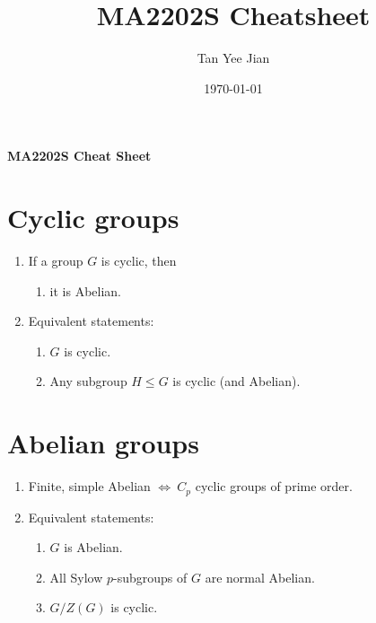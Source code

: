 \documentclass[10pt]{article}
\title{MA2202S Cheatsheet}
\author{Tan Yee Jian}
\date{\today}
\newcommand{\spss}{Sylow $p$-subgroups }
\begin{document}
\begin{center}
  \Large{\textbf{MA2202S Cheat Sheet}}
\end{center}
\begin{multicols*}{3}
  \section{Cyclic groups}
  \begin{enumerate}
    \item If a group $G$ is cyclic, then
    \begin{enumerate}
\item it is Abelian.
    \end{enumerate}
    \item Equivalent statements:
    \begin{enumerate}
      \item $G$ is cyclic.
      \item Any subgroup $H\leq G$ is cyclic (and Abelian).
    \end{enumerate}
  \end{enumerate}
  \section{Abelian groups}
\begin{enumerate}
    \item Finite, simple Abelian $\iff\ C_{p}$ cyclic groups of prime order.
  \item Equivalent statements:
    \begin{enumerate}
      \item $G$ is Abelian.
        \item All \spss of $G$ are normal Abelian.
        \item $G/Z(G)$ is cyclic.
    \end{enumerate}
\end{enumerate}


\end{multicols*}
\end{document}
